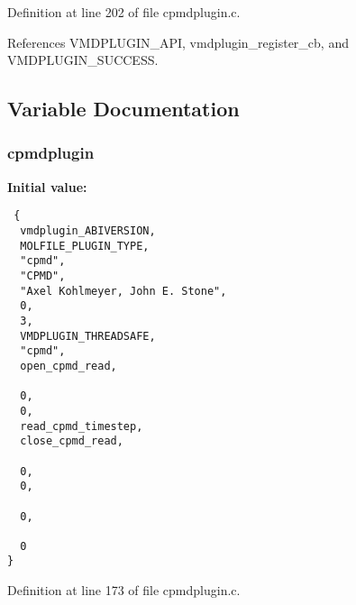 Definition at line 202 of file cpmdplugin.c.

References VMDPLUGIN\_\-API, vmdplugin\_\-register\_\-cb, and VMDPLUGIN\_\-SUCCESS.

\subsection{Variable Documentation}
\subsubsection{ cpmdplugin\hspace{0.3cm}{\tt  [static]}}\label{cpmdplugin_8c_a0}


{\bf Initial value:}

\footnotesize\begin{verbatim} {
  vmdplugin_ABIVERSION,
  MOLFILE_PLUGIN_TYPE,                         
  "cpmd",                                      
  "CPMD",                                      
  "Axel Kohlmeyer, John E. Stone",             
  0,                                           
  3,                                           
  VMDPLUGIN_THREADSAFE,                        
  "cpmd",
  open_cpmd_read,

  0,
  0,
  read_cpmd_timestep,
  close_cpmd_read,

  0,
  0,

  0,

  0
}\end{verbatim}\normalsize 


Definition at line 173 of file cpmdplugin.c.